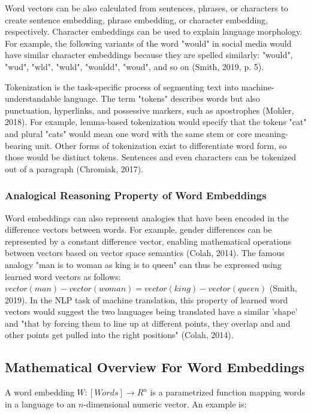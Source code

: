 Word vectors can be also calculated from sentences, phrases, or characters to create sentence embedding, phrase embedding, or character embedding, respectively. Character embeddings can be used to explain language morphology. For example, the following variants of the word "would" in social media would have similar character embeddings because they are spelled similarly: "would", "wud", "wld", "wuld", "wouldd", "woud", and so on (Smith, 2019, p. 5). 

Tokenization is the task-specific process of segmenting text into machine-understandable language. The term "tokens" describes words but also punctuation, hyperlinks, and possessive markers, such as apostrophes (Mohler, 2018). For example, lemma-based tokenization would specify that the tokens "cat" and plural "cats" would mean one word with the same stem or core meaning-bearing unit. Other forms of tokenization exist to differentiate word form, so those would be distinct tokens. Sentences and even characters can be tokenized out of a paragraph (Chromiak, 2017). 

\subsubsection{Analogical Reasoning Property of Word Embeddings}
Word embeddings can also represent analogies that have been encoded in the difference vectors between words. For example, gender differences can be represented by a constant difference vector, enabling mathematical operations between vectors based on vector space semantics (Colah, 2014). The famous analogy "man is to woman as king is to queen" can thus be expressed using learned word vectors as follows: $vector(man) - vector(woman) = vector(king) - vector(queen)$ (Smith, 2019). In the NLP task of machine translation, this property of learned word vectors would suggest the two languages being translated have a similar 'shape' and "that by forcing them to line up at different points, they overlap and and other points get pulled into the right positions" (Colah, 2014).

\subsection{Mathematical Overview For Word Embeddings}
 
A word embedding $W: [Words] \rightarrow R^n$ is a parametrized function mapping words in a language to an $n$-dimensional numeric vector. An example is: 

